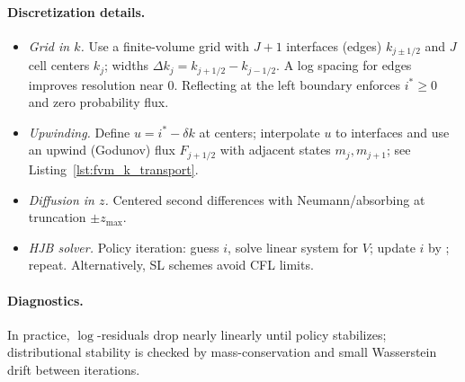 \documentclass[11pt,letterpaper,oneside]{article}
\numberwithin{equation}{section}
\newcommand{\ac}[1]{{\mdseries\textsc{#1}}}
\newcommand{\1}{\mathbf{1}}
\begin{document}
\paragraph{Discretization details.}
\begin{itemize}[leftmargin=1.25em]
\item \emph{Grid in $k$.} Use a finite-volume grid with $J+1$ interfaces (edges) $k_{j\pm 1/2}$ and $J$ cell centers $k_j$; widths $\Delta k_j = k_{j+1/2}-k_{j-1/2}$. A log spacing for edges improves resolution near $0$. Reflecting at the left boundary enforces $i^*\!\ge 0$ and zero probability flux.
\item \emph{Upwinding.} Define $u=i^*-\delta k$ at centers; interpolate $u$ to interfaces and use an upwind (Godunov) flux $F_{j+1/2}$ with adjacent states $m_j,m_{j+1}$; see Listing~\ref{lst:fvm_k_transport}.
\item \emph{Diffusion in $z$.} Centered second differences with Neumann/absorbing at truncation $\pm z_{\max}$.
\item \emph{HJB solver.} Policy iteration: guess $i$, solve linear system for $V$; update $i$ by ; repeat. Alternatively, \ac{SL} schemes avoid CFL limits.
\end{itemize}

\paragraph{Diagnostics.} In practice, $\log$-residuals drop nearly linearly until policy stabilizes; distributional stability is checked by mass-conservation and small Wasserstein drift between iterations.
\end{document}
